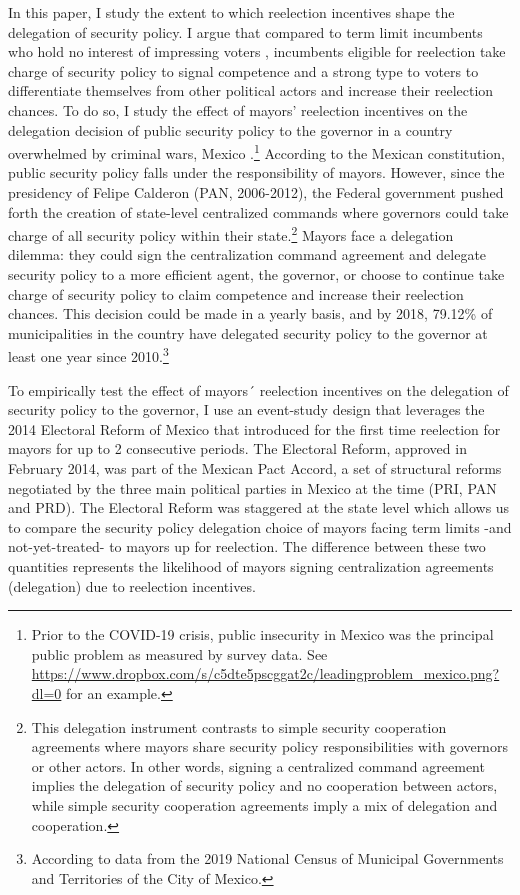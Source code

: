 In this paper, I study the extent to which reelection incentives shape the delegation of security policy. I argue that compared to term limit incumbents who hold no interest of impressing voters \citep{ashworth_2012}, incumbents eligible for reelection take charge of security policy to signal competence and a strong type to voters to differentiate themselves from other political actors and increase their reelection chances.  To do so, I study the effect of mayors' reelection incentives on the delegation decision of public security policy to the governor in a country overwhelmed by criminal wars, Mexico \citep{ley_trejo_2020}.\footnote{Prior to the COVID-19 crisis, public insecurity in Mexico was the principal public problem as measured by survey data. See \url{https://www.dropbox.com/s/c5dte5pscggat2c/leadingproblem_mexico.png?dl=0} for an example.} According to the Mexican constitution, public security policy falls under the responsibility of mayors. However, since the presidency of Felipe Calderon (PAN, 2006-2012), the Federal government pushed forth the creation of state-level centralized commands where governors could take charge of all security policy within their state.\footnote{This delegation instrument contrasts to simple security cooperation agreements where mayors share security policy responsibilities with governors or other actors. In other words, signing a centralized command agreement implies the delegation of security policy and no cooperation between actors, while simple security cooperation agreements imply a mix of delegation and cooperation.} Mayors face a delegation dilemma: they could sign the centralization command agreement and delegate security policy to a more efficient agent, the governor, or choose to continue take charge of security policy to claim competence and increase their reelection chances. This decision could be made in a yearly basis, and by 2018, 79.12\% of municipalities in the country have delegated security policy to the governor at least one year since 2010.\footnote{According to data from the 2019 National Census of Municipal Governments and Territories of the City of Mexico.} 
          
To empirically test the effect of mayors´ reelection incentives on the delegation of security policy to the governor, I use an event-study design that leverages the 2014 Electoral Reform of Mexico that introduced for the first time reelection for mayors for up to 2 consecutive periods. The Electoral Reform, approved in February 2014, was part of the Mexican Pact Accord, a set of structural reforms negotiated by the three main political parties in Mexico at the time (PRI, PAN and PRD). The Electoral Reform was staggered at the state level which allows us to compare the security policy delegation choice of mayors facing term limits -and not-yet-treated- to mayors up for reelection. The difference between these two quantities represents the likelihood of mayors signing centralization agreements (delegation) due to reelection incentives. 
          
